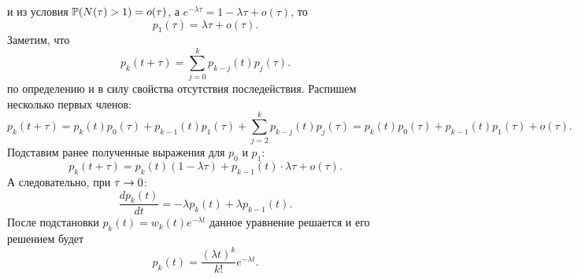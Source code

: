 и из условия $\P(N(\tau) > 1) = o(\tau)$, а $e^{-\lambda \tau} = 1 - \lambda \tau + o(\tau)$, то
\[
    p_1(\tau) = \lambda\tau + o(\tau).
\]
Заметим, что
\[
    p_k(t + \tau) = \sum\limits_{j = 0}^{k} p_{k - j}(t)p_{j}(\tau).
\]
по определению и в силу свойства отсутствия последействия. Распишем несколько первых членов:
\[
    p_k(t + \tau) = p_k(t)p_0(\tau) + p_{k - 1}(t)p_1(\tau) + \sum\limits_{j = 2}^{k}p_{k - j}(t)p_j(\tau) = p_k(t)p_0(\tau) + p_{k - 1}(t)p_1(\tau) + o(\tau).
\]
Подставим ранее полученные выражения для $p_0$ и $p_1$:
\[
    p_k(t + \tau) = p_k(t)(1 - \lambda \tau) + p_{k - 1}(t)\cdot \lambda \tau + o(\tau).
\]
А следовательно, при $\tau \ra 0$:
\[
    \dfrac{dp_k(t)}{dt} = -\lambda p_k(t) + \lambda p_{k - 1}(t).
\]
После подстановки $p_k(t) = w_k(t) e^{-\lambda t}$ данное уравнение решается и его решением будет
\[
    p_k(t) = \dfrac{(\lambda t)^k}{k!}e^{-\lambda t}.
\]